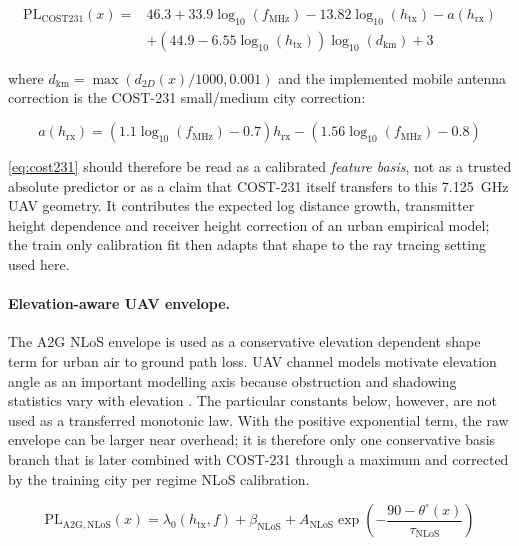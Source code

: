 \begin{equation}
\begin{aligned}
\mathrm{PL}_{\mathrm{COST231}}(x)
={}&
46.3 + 33.9 \log_{10}(f_{\mathrm{MHz}})
- 13.82 \log_{10}(h_{\mathrm{tx}})
- a(h_{\mathrm{rx}})\\
&+
\left(44.9 - 6.55 \log_{10}(h_{\mathrm{tx}})\right)
\log_{10}(d_{\mathrm{km}})
+ 3
\end{aligned}
\label{eq:cost231}
\end{equation}

where $d_{\mathrm{km}} = \max(d_{2D}(x)/1000, 0.001)$ and the implemented
mobile antenna correction is the COST-231 small/medium city correction:

\begin{equation}
a(h_{\mathrm{rx}})
=
\left(1.1\log_{10}(f_{\mathrm{MHz}})-0.7\right)h_{\mathrm{rx}}
-
\left(1.56\log_{10}(f_{\mathrm{MHz}})-0.8\right)
\label{eq:cost231_a}
\end{equation}

\eqref{eq:cost231} should therefore be read as a calibrated
\emph{feature basis}, not as a trusted absolute predictor or as a claim that
COST-231 itself transfers to this \SI{7.125}{GHz} UAV geometry. It contributes
the expected log distance growth, transmitter height dependence and receiver
height correction of an urban empirical model; the train only calibration fit
then adapts that shape to the ray tracing setting used here.

\paragraph{Elevation-aware UAV envelope.}
The A2G NLoS envelope is used as a conservative elevation dependent shape term
for urban air to ground path loss. UAV channel models motivate elevation angle
as an important modelling axis because obstruction and shadowing statistics vary
with elevation \cite{khawaja_survey,tr38901}. The particular constants below,
however, are not used as a transferred monotonic law. With the positive
exponential term, the raw envelope can be larger near overhead; it is therefore
only one conservative basis branch that is later combined with COST-231 through
a maximum and corrected by the training city per regime NLoS calibration.

\begin{equation}
\mathrm{PL}_{\mathrm{A2G,NLoS}}(x)
=
\lambda_0(h_{\mathrm{tx}}, f)
+ \beta_{\mathrm{NLoS}}
+ A_{\mathrm{NLoS}}
\exp\!\left(-\frac{90-\theta^\circ(x)}{\tau_{\mathrm{NLoS}}}\right)
\label{eq:a2g_nlos}
\end{equation}

